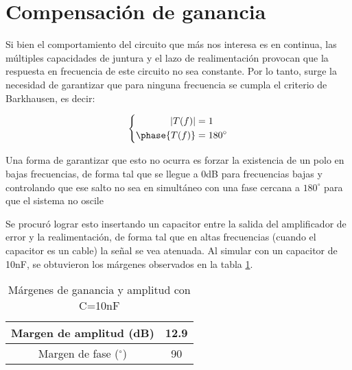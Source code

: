 \documentclass[e2_tp1_main.tex]{subfiles}
\begin{document}
\section{Compensaci\'on de ganancia}

Si bien el comportamiento del circuito que m\'as nos interesa es en continua, las m\'ultiples capacidades de juntura y el lazo de realimentaci\'on provocan que la respuesta en frecuencia de este circuito no sea constante. Por lo tanto, surge la necesidad de garantizar que para ninguna frecuencia se cumpla el criterio de Barkhausen, es decir:

\[
\left\{
\begin{aligned}
|T(f)| &= 1 \\
\phase{T(f)} &= 180^\circ
\end{aligned}
\right.
\]

Una forma de garantizar que esto no ocurra es forzar la existencia de un polo en bajas frecuencias, de forma tal que se llegue a 0dB para frecuencias bajas y controlando que ese salto no sea en simult\'aneo con una fase cercana a $180^\circ$ para que el sistema no oscile

Se procur\'o lograr esto insertando un capacitor entre la salida del amplificador de error y la realimentaci\'on, de forma tal que en altas frecuencias (cuando el capacitor es un cable) la se\~nal se vea atenuada. Al simular con un capacitor de 10nF, se obtuvieron los m\'argenes observados en la tabla \ref{table:barkhausen}.

\begin{table}[htb!]
\centering
\begin{tabular}{|c||c|}
\hline
Margen de amplitud (dB)   & 12.9 \\ \hline
Margen de fase ($^\circ$) & 90   \\ \hline
\end{tabular}
\caption{M\'argenes de ganancia y amplitud con C=10nF}
\label{table:barkhausen}
\end{table}
\end{document}

